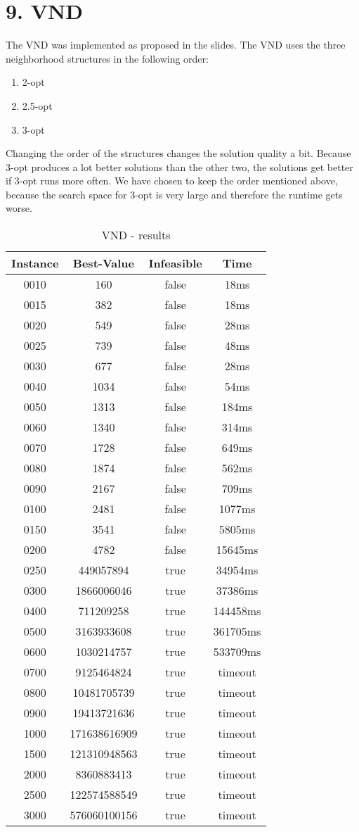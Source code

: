 \section*{9. VND}
The VND was implemented as proposed in the slides. The VND uses the three neighborhood structures in the following order:
\begin{enumerate}
  \item 2-opt
  \item 2.5-opt
  \item 3-opt
\end{enumerate}
Changing the order of the structures changes the solution quality a bit. Because 3-opt produces a lot better solutions than the other two, the solutions get better if 3-opt runs more often. We have chosen to keep the order mentioned above, because the search space for 3-opt is very large and therefore the runtime gets worse.

\begin{table}
\centering
	\begin{tabular}{|| c | c | c | c ||} 
		\hline
		Instance & Best-Value & Infeasible & Time \\
		\hline\hline
0010 & 160 & false & 18ms \\
0015 & 382 & false & 18ms \\
0020 & 549 & false & 28ms \\
0025 & 739 & false & 48ms \\
0030 & 677 & false & 28ms \\
0040 & 1034 & false & 54ms \\
0050 & 1313 & false & 184ms \\
0060 & 1340 & false & 314ms \\
0070 & 1728 & false & 649ms \\
0080 & 1874 & false & 562ms \\
0090 & 2167 & false & 709ms \\
0100 & 2481 & false & 1077ms \\
0150 & 3541 & false & 5805ms \\
0200 & 4782 & false & 15645ms \\
0250 & 449057894 & true & 34954ms \\
0300 & 1866006046 & true & 37386ms \\
0400 & 711209258 & true & 144458ms \\
0500 & 3163933608 & true & 361705ms \\
0600 & 1030214757 & true & 533709ms \\
0700 & 9125464824 & true & timeout \\
0800 & 10481705739 & true & timeout \\
0900 & 19413721636 & true & timeout \\
1000 & 171638616909 & true & timeout \\
1500 & 121310948563 & true & timeout \\
2000 & 8360883413 & true & timeout \\
2500 & 122574588549 & true & timeout \\
3000 & 576060100156 & true & timeout \\
		\hline
	\end{tabular}
\caption{VND - results}
\end{table}